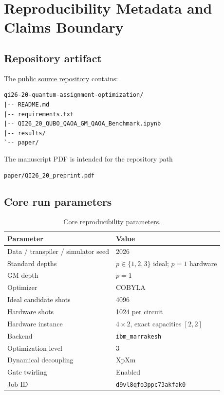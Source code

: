 \section{Reproducibility Metadata and Claims Boundary}
\label{app:reproducibility}

\subsection{Repository artifact}

The \href{https://github.com/qubitmx/qi26-20-quantum-assignment-optimization}{public source repository} contains:
\begin{verbatim}
qi26-20-quantum-assignment-optimization/
|-- README.md
|-- requirements.txt
|-- QI26_20_QUBO_QAOA_GM_QAOA_Benchmark.ipynb
|-- results/
`-- paper/
\end{verbatim}
The manuscript PDF is intended for the repository path
\begin{verbatim}
paper/QI26_20_preprint.pdf
\end{verbatim}

\subsection{Core run parameters}

\begin{table}[H]
\centering
\caption{Core reproducibility parameters.}
\begin{tabular}{ll}
\toprule
Parameter & Value\\
\midrule
Data / transpiler / simulator seed & 2026\\
Standard depths & $p\in\{1,2,3\}$ ideal; $p=1$ hardware\\
GM depth & $p=1$\\
Optimizer & COBYLA\\
Ideal candidate shots & 4096\\
Hardware shots & 1024 per circuit\\
Hardware instance & $4\times2$, exact capacities $[2,2]$\\
Backend & \texttt{ibm\_marrakesh}\\
Optimization level & 3\\
Dynamical decoupling & XpXm\\
Gate twirling & Enabled\\
Job ID & \texttt{d9vl8qfo3ppc73akfak0}\\
\bottomrule
\end{tabular}
\end{table}

